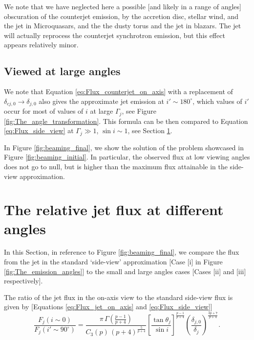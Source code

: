 We note that we have neglected here a possible [and likely in a range of angles] obscuration of the counterjet emission, by the accretion disc, stellar wind, and the jet in Microquasars, and the the dusty torus and the jet in blazars. The jet will actually reprocess the counterjet synchrotron emission, but this effect appears relatively minor.





\subsection{Viewed at large angles}
We note that Equation \ref{eq:Flux_counterjet_on_axis} with a replacement of $ \delta_{cj,0} \rightarrow \delta_{j,0} $ also gives the approximate jet emission at $ i' \sim 180 ^{\circ} $, which values of $i'$ occur for most of values of $i$ at large $ \Gamma_j $, see Figure \ref{fig:The_angle_transformation}. This formula can be then compared to Equation \ref{eq:Flux_side_view} at $\Gamma_j \gg 1$, $\sin i \sim 1$, see Section \ref{sec:comparison}.

In Figure \ref{fig:beaming_final}, we show the solution of the problem showcased in Figure \ref{fig:beaming_initial}. In particular, the observed flux at low viewing angles does not go to null, but is higher than the maximum flux attainable in the side-view approximation.






\section{The relative jet flux at different angles}
\label{sec:comparison}
In this Section, in reference to Figure \ref{fig:beaming_final}, we compare the flux from the jet in the standard `side-view' approximation [Case [i] in Figure \ref{fig:The_emission_angles}] to the small and large angles cases [Cases [ii] and [iii] respectively].

The ratio of the jet flux in the on-axis view to the standard side-view flux is given by [Equations \ref{eq:Flux_jet_on_axis} and \ref{eq:Flux_side_view}]
\begin{equation}
\frac{F_j (i \sim 0)}{F_j (i' \sim 90^{\circ})} = \dfrac{ \pi \, \Gamma \left( \frac{p-1}{p+4} \right) }{ C_3(p) \, (p+4)^{\frac{5}{p+4}} } \left[ \frac{\tan \theta_j}{\sin i} \right]^{ \frac{p-1}{p+4} } \left( \frac{\delta_{j,0}}{\delta_j} \right)^{ \frac{3p+7}{p+4} }.
\end{equation}

